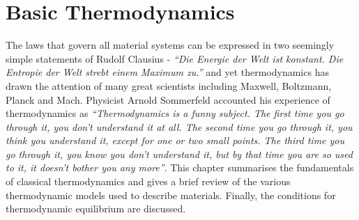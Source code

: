 \chapter{Basic Thermodynamics} \label{chapter_3}

The laws that govern all material systems can be expressed in two seemingly simple statements of Rudolf Clausius - \emph{``Die Energie der Welt ist konstant. Die Entropie der Welt strebt einem Maximum zu.''}   and yet thermodynamics has drawn the attention of many great scientists including Maxwell, Boltzmann, Planck and  Mach. Physicist Arnold Sommerfeld accounted his experience of thermodynamics as \emph{``Thermodynamics is a funny subject. The first time you go through it, you don't understand it at all. The second time you go through it, you think you understand it, except for one or two small points. The third time you go through it, you know you don't understand it, but by that time you are so used to it, it doesn't bother you any more''}. This chapter summarises the fundamentals of classical thermodynamics and gives a brief review of the various thermodynamic models used to describe materials. Finally, the conditions for thermodynamic equilibrium are discussed.

